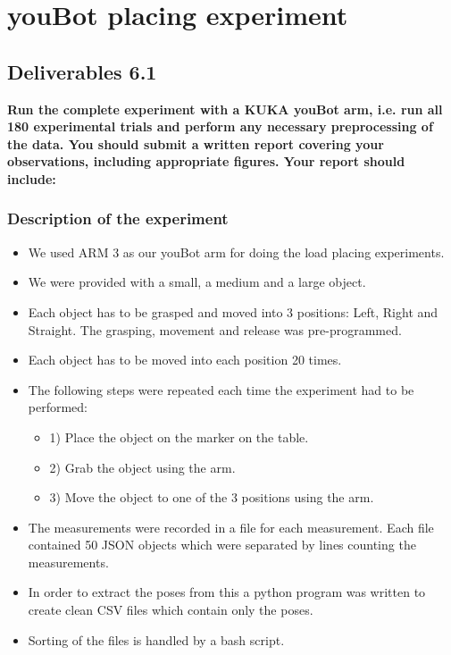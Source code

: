 \chapter{youBot placing experiment}
\section{Deliverables 6.1}
\textbf{Run the complete experiment with a KUKA youBot arm, i.e. run all 180 experimental trials and perform any necessary preprocessing of the data. You should submit a written report covering your observations, including appropriate figures. Your report should include:}

\subsection{Description of the experiment}

\begin{itemize}
	\item We used ARM 3 as our youBot arm for doing the load placing experiments.
	\item We were provided with a small, a medium and a large object.
	\item Each object has to be grasped and moved into 3 positions: Left, Right and Straight. The grasping, movement and release was pre-programmed.
	\item Each object has to be moved into each position 20 times.
	\item The following steps were repeated each time the experiment had to be performed:
	\begin{itemize}
		\item 1) Place the object on the marker on the table.
		\item 2) Grab the object using the arm.
		\item 3) Move the object to one of the 3 positions using the arm.
	\end{itemize}
	\item The measurements were recorded in a file for each measurement. Each file contained 50 JSON objects which were separated by lines counting the measurements.
	\item In order to extract the poses from this a python program was written to create clean CSV files which contain only the poses.
	\item Sorting of the files is handled by a bash script.
\end{itemize}


